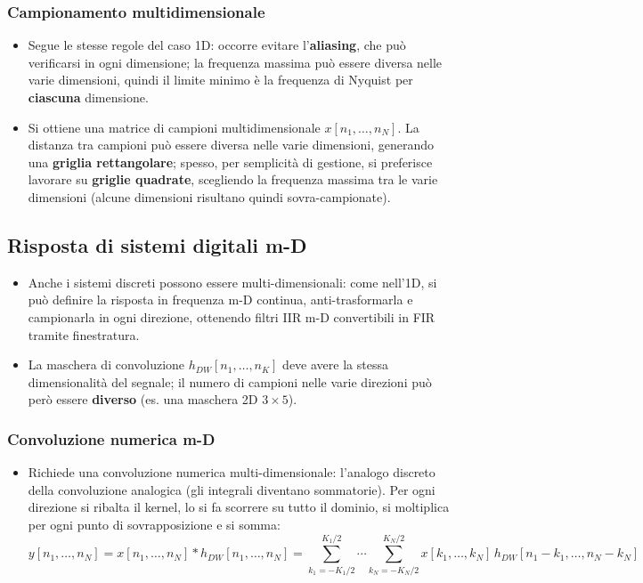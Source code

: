 \documentclass[12pt, a4paper]{article}
\begin{document}
\subsubsection{Campionamento multidimensionale}
\begin{itemize}
    \item Segue le stesse regole del caso 1D: occorre evitare l'\textbf{aliasing}, che può verificarsi in ogni dimensione; la frequenza massima può essere diversa nelle varie dimensioni, quindi il limite minimo è la frequenza di Nyquist per \textbf{ciascuna} dimensione.
    \item Si ottiene una matrice di campioni multidimensionale $x[n_1,\dots,n_N]$. La distanza tra campioni può essere diversa nelle varie dimensioni, generando una \textbf{griglia rettangolare}; spesso, per semplicità di gestione, si preferisce lavorare su \textbf{griglie quadrate}, scegliendo la frequenza massima tra le varie dimensioni (alcune dimensioni risultano quindi sovra-campionate).
\end{itemize}

\subsection{Risposta di sistemi digitali m-D}
\begin{itemize}
    \item Anche i sistemi discreti possono essere multi-dimensionali: come nell'1D, si può definire la risposta in frequenza m-D continua, anti-trasformarla e campionarla in ogni direzione, ottenendo filtri IIR m-D convertibili in FIR tramite finestratura.
    \item La maschera di convoluzione $h_{DW}[n_1,\dots,n_K]$ deve avere la stessa dimensionalità del segnale; il numero di campioni nelle varie direzioni può però essere \textbf{diverso} (es. una maschera 2D $3\times5$).
\end{itemize}

\subsubsection{Convoluzione numerica m-D}
\begin{itemize}
    \item Richiede una convoluzione numerica multi-dimensionale: l'analogo discreto della convoluzione analogica (gli integrali diventano sommatorie). Per ogni direzione si ribalta il kernel, lo si fa scorrere su tutto il dominio, si moltiplica per ogni punto di sovrapposizione e si somma:
    $$y[n_1,\dots,n_N] = x[n_1,\dots,n_N]*h_{DW}[n_1,\dots,n_N] = \sum_{k_1=-K_1/2}^{K_1/2}\cdots\sum_{k_N=-K_N/2}^{K_N/2} x[k_1,\dots,k_N]\,h_{DW}[n_1-k_1,\dots,n_N-k_N]$$
\end{itemize}
\end{document}
